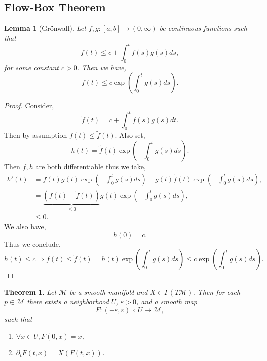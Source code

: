 \documentclass[10pt]{article}
\newtheorem{theorem}{Theorem} [section]
\newtheorem{lemma}{Lemma}[section]
\newcommand{\M}[0]{\mathcal{M}}
\begin{document}
\subsection{Flow-Box Theorem}
\begin{lemma}[Grönwall]
  \label{gronwall_lemma}
  Let $f,g:[a,b]\to(0,\infty)$ be continuous functions such that 
  \begin{equation*}
    f(t)\leq c+\int_0^t f(s)g(s)ds,
  \end{equation*}
  for some constant $c>0$. Then we have,
  \begin{equation*}
    f(t)\leq c\exp\left(\int_0^tg(s)ds\right).
  \end{equation*}
\end{lemma}
\begin{proof}
  Consider,
  \begin{equation*}
    \tilde{f}(t) = c+\int_0^t f(s)g(s)dt.
  \end{equation*}
  Then by assumption $f(t)\leq \tilde{f}(t)$. Also set,
  \begin{equation*}
    h(t) = \tilde{f}(t)\exp\left(-\int_0^t g(s)ds\right).
  \end{equation*}
  Then $f,h$ are both differentiable thus we take,
  \begin{align*}
    h'(t) &= f(t)g(t)\exp\left(-\int_0^t g(s)ds\right)-g(t)\tilde{f}(t)\exp\left(-\int_0^t g(s)ds\right),\\
    &= \underbrace{(f(t)-\tilde{f}(t))}_{\leq 0}g(t)\exp\left(-\int_0^t g(s)ds\right),\\
    &\leq 0.
  \end{align*}
  We also have,
  \begin{equation*}
    h(0) = c.
  \end{equation*}
  Thus we conclude,
  \begin{equation*}
    h(t)\leq c\Rightarrow f(t)\leq \tilde{f}(t)=h(t)\exp\left(\int_0^t g(s)ds\right)\leq c\exp\left(\int_0^t g(s)ds\right).
  \end{equation*}
\end{proof}
\begin{theorem}
  \label{theorem_flow_box}
  Let $\M$ be a smooth manifold and $X\in\Gamma(T\M)$. Then for each $p\in\M$ there exists a neighborhood $U$, $\varepsilon>0$, and a smooth map 
  \begin{equation*}
    F:(-\varepsilon,\varepsilon)\times U\to\M,
  \end{equation*}
  such that 
  \begin{enumerate}[1).]
    \item $\forall x\in U, F(0,x)=x$,
    \item $\partial_tF(t,x) = X(F(t,x))$.
  \end{enumerate}
\end{theorem}
\end{document}
